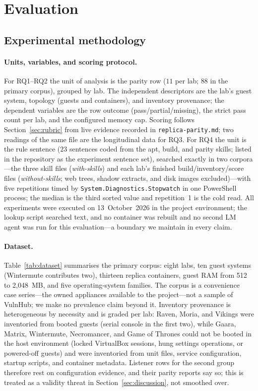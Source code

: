 \documentclass[3p,twocolumn,authoryear]{elsarticle}
\begin{document}
\section{Evaluation}
\label{sec:eval}

\subsection{Experimental methodology}
\label{sec:eval-setup}

\paragraph{Units, variables, and scoring protocol.}
For RQ1--RQ2 the unit of analysis is the parity row ($11$ per lab;
$88$ in the primary corpus), grouped by lab. The independent
descriptors are the lab's guest system, topology (guests and
containers), and inventory provenance; the dependent variables are the
row outcome (pass/partial/missing), the strict pass count per lab, and
the configured memory cap. Scoring follows Section~\ref{sec:rubric}
from live evidence recorded in \texttt{replica-parity.md}; two
readings of the same file are the longitudinal data for RQ3. For RQ4
the unit is the rule sentence ($23$ sentences coded from the apt,
build, and parity skills; listed in the repository as the experiment
sentence set), searched exactly in two corpora---the three skill files
(\emph{with-skills}) and each lab's finished build/inventory/score
files (\emph{without-skills}; web trees, shadow extracts, and disk
images excluded)---with five repetitions timed by
\texttt{System.Diagnostics.Stopwatch} in one PowerShell process; the
median is the third sorted value and repetition~1 is the cold read.
All experiments were executed on 13~October~2026 in the project
environment; the lookup script searched text, and no container was
rebuilt and no second LM agent was run for this evaluation---a boundary
we maintain in every claim.

\paragraph{Dataset.}
Table~\ref{tab:dataset} summarises the primary corpus: eight labs, ten
guest systems (Wintermute contributes two), thirteen replica
containers, guest RAM from 512 to 2,048~MB, and five operating-system
families. The corpus is a convenience case series---the owned
appliances available to the project---not a sample of VulnHub; we make
no prevalence claim beyond it. Inventory provenance is heterogeneous
by necessity and is graded per lab: Raven, Moria, and Vikings were
inventoried from booted guests (serial console in the first two),
while Gaara, Matrix, Wintermute, Necromancer, and Game of Thrones
could not be booted in the host environment (locked VirtualBox
sessions, hung settings operations, or powered-off guests) and were
inventoried from unit files, service configuration, startup scripts,
and container metadata. Listener rows for the second group therefore
rest on configuration evidence, and their parity reports say so; this
is treated as a validity threat in Section~\ref{sec:discussion}, not
smoothed over.
\end{document}
